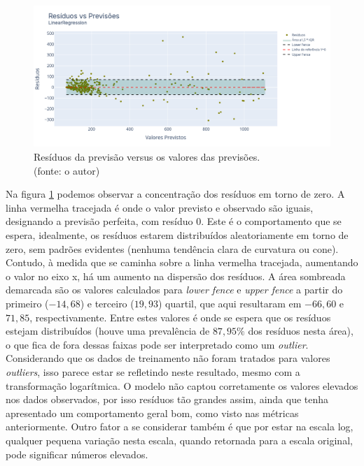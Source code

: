 \begin{figure}[!h]
	\centering
	\includegraphics[scale=0.33]{Figuras/jequiti/resultados/LR_WFV_LOG_RESID_x_PREV.png}
	\caption{Resíduos da previsão versus os valores das previsões.\\(fonte: o autor)}
	\label{fig:jequiti_LR_WFV_LOG_RESID_x_PREV}
\end{figure}

Na figura \ref{fig:jequiti_LR_WFV_LOG_RESID_x_PREV} podemos observar a concentração dos resíduos em torno de zero. A linha vermelha tracejada é onde o valor previsto e observado são iguais, designando a previsão perfeita, com resíduo $0$. Este é o comportamento que se espera, idealmente, os resíduos estarem distribuídos aleatoriamente em torno de zero, sem padrões evidentes (nenhuma tendência clara de curvatura ou cone). Contudo, à medida que se caminha sobre a linha vermelha tracejada, aumentando o valor no eixo x, há um aumento na dispersão dos resíduos. A área sombreada demarcada são os valores calculados para \textit{lower fence} e \textit{upper fence} a partir do primeiro ($-14,68$) e terceiro ($19,93$) quartil, que aqui resultaram em $-66,60$ e $71,85$, respectivamente. Entre estes valores é onde se espera que os resíduos estejam distribuídos (houve uma prevalência de $87,95\%$ dos resíduos nesta área), o que fica de fora dessas faixas pode ser interpretado como um \textit{outlier}. Considerando que os dados de treinamento não foram tratados para valores \textit{outliers}, isso parece estar se refletindo neste resultado, mesmo com a transformação logarítmica. O modelo não captou corretamente os valores elevados nos dados observados, por isso resíduos tão grandes assim, ainda que tenha apresentado um comportamento geral bom, como visto nas métricas anteriormente. Outro fator a se considerar também é que por estar na escala log, qualquer pequena variação nesta escala, quando retornada para a escala original, pode significar números elevados.

